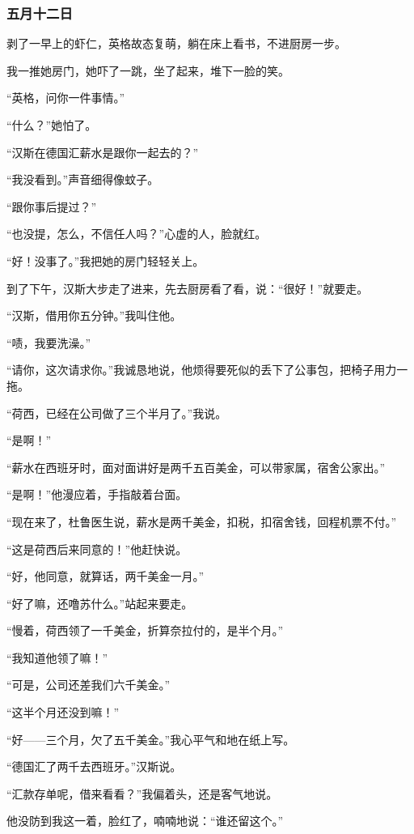 \subsubsection{五月十二日}
\par 剥了一早上的虾仁，英格故态复萌，躺在床上看书，不进厨房一步。
\par 我一推她房门，她吓了一跳，坐了起来，堆下一脸的笑。
\par “英格，问你一件事情。”
\par “什么？”她怕了。
\par “汉斯在德国汇薪水是跟你一起去的？”
\par “我没看到。”声音细得像蚊子。
\par “跟你事后提过？”
\par “也没提，怎么，不信任人吗？”心虚的人，脸就红。
\par “好！没事了。”我把她的房门轻轻关上。
\par 到了下午，汉斯大步走了进来，先去厨房看了看，说：“很好！”就要走。
\par “汉斯，借用你五分钟。”我叫住他。
\par “啧，我要洗澡。”
\par “请你，这次请求你。”我诚恳地说，他烦得要死似的丢下了公事包，把椅子用力一拖。
\par “荷西，已经在公司做了三个半月了。”我说。
\par “是啊！”
\par “薪水在西班牙时，面对面讲好是两千五百美金，可以带家属，宿舍公家出。”
\par “是啊！”他漫应着，手指敲着台面。
\par “现在来了，杜鲁医生说，薪水是两千美金，扣税，扣宿舍钱，回程机票不付。”
\par “这是荷西后来同意的！”他赶快说。
\par “好，他同意，就算话，两千美金一月。”
\par “好了嘛，还噜苏什么。”站起来要走。
\par “慢着，荷西领了一千美金，折算奈拉付的，是半个月。”
\par “我知道他领了嘛！”
\par “可是，公司还差我们六千美金。”
\par “这半个月还没到嘛！”
\par “好——三个月，欠了五千美金。”我心平气和地在纸上写。
\par “德国汇了两千去西班牙。”汉斯说。
\par “汇款存单呢，借来看看？”我偏着头，还是客气地说。
\par 他没防到我这一着，脸红了，喃喃地说：“谁还留这个。”
